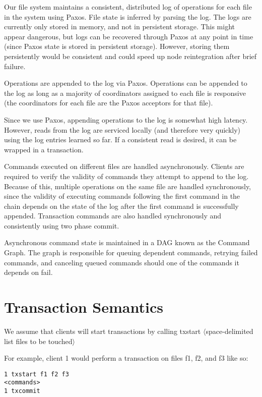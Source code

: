 \documentclass[11pt]{article}
\begin{document}
Our file system maintains a consistent, distributed log of operations for each file in the system using Paxos. File state is inferred by parsing the log.
The logs are currently only stored in memory, and not in persistent storage. This might appear dangerous, but logs can be recovered through Paxos at any point in time (since Paxos state is stored in persistent storage).  However, storing them persistently would be consistent and could speed up node reintegration after brief failure.

Operations are appended to the log via Paxos. Operations can be appended to the log as long as a majority of coordinators assigned to each file is responsive (the coordinators for each file are the Paxos acceptors for that file).

Since we use Paxos, appending operations to the log is somewhat high latency.
However, reads from the log are serviced locally (and therefore very quickly) using the log entries learned so far.
If a consistent read is desired, it can be wrapped in a transaction.

Commands executed on different files are handled asynchronously.
Clients are required to verify the validity of commands they attempt to append to the log. 
Because of this, multiple operations on the same file are handled synchronously, since the validity of executing commands
following the first command in the chain depends on the state of the log after the first command is successfully appended.
Transaction commands are also handled synchronously and consistently using two phase commit.

Asynchronous command state is maintained in a DAG known as the Command Graph.
The graph is responsible for queuing dependent commands, retrying failed commands, and canceling queued commands should one of the commands it depends on fail.

\section{Transaction Semantics}
We assume that clients will start transactions by calling txstart $\langle$space-delimited list files to be touched$\rangle$ %

For example, client 1 would perform a transaction on files f1, f2, and f3 like so:

\begin{verbatim}
1 txstart f1 f2 f3
<commands>
1 txcommit
\end{verbatim}
\end{document}
